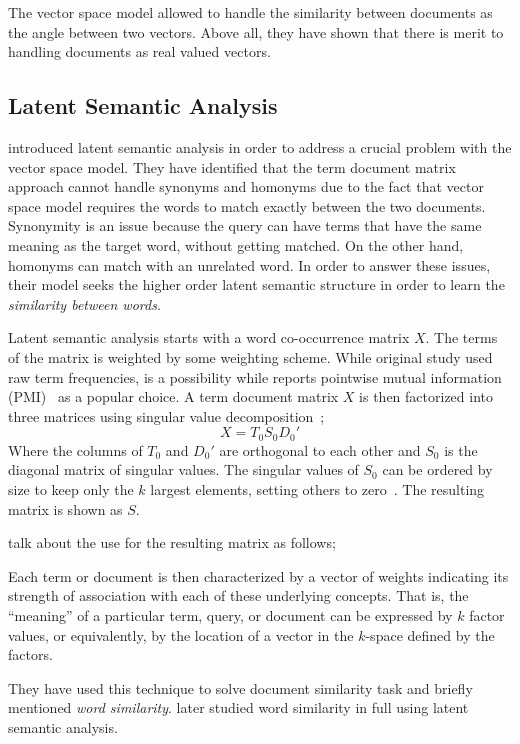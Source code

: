 The vector space model allowed \citeauthor{salton_vector_1975} to handle the similarity between documents as the angle between two vectors.
Above all, they have shown that there is merit to handling documents as real valued vectors.

\subsection{Latent Semantic Analysis}%
\label{sub:latent_semantic_analysis}

\textcite{deerwester_indexing_1990} introduced latent semantic analysis in order to address a crucial problem with the vector space model.
They have identified that the term document matrix approach cannot handle synonyms and homonyms due to the fact that vector space model requires the words to match exactly between the two documents.
Synonymity is an issue because the query can have terms that have the same meaning as the target word, without getting matched.
On the other hand, homonyms can match with an unrelated word.
In order to answer these issues, their model seeks the higher order latent semantic structure in order to learn the \emph{similarity between words}.

Latent semantic analysis starts with a word co-occurrence matrix $X$.
The terms of the matrix is weighted by some weighting scheme.
While original study used raw term frequencies, \tfidf{} is a possibility while \textcite{levy_improving_2015} reports pointwise mutual information (PMI)~\cite{church_word_1990} as a popular choice.
A term document matrix $X$ is then factorized into three matrices using singular value decomposition~\cite{forsythe_computer_1977};
\begin{displaymath}
    X = T_{0}S_{0}D_{0}'
\end{displaymath}
Where the columns of $T_{0}$ and $D_{0}'$ are orthogonal to each other and $S_{0}$ is the diagonal matrix of singular values.
The singular values of $S_{0}$ can be ordered by size to keep only the $k$ largest elements, setting others to zero~\cite{deerwester_indexing_1990}.
The resulting matrix is shown as $S$.

\citeauthor{deerwester_indexing_1990} talk about the use for the resulting matrix as follows;
\begin{displayquote}
    Each term or document is then characterized by a vector of weights indicating its strength of association with each of these underlying concepts.
    That is, the \enquote{meaning} of a particular term, query, or document can be expressed by $k$ factor values, or equivalently, by the location of a vector in the $k$-space defined by the factors.
\end{displayquote}
They have used this technique to solve document similarity task and briefly mentioned \emph{word similarity}.
\textcite{landauer_solution_1997} later studied word similarity in full using latent semantic analysis.


